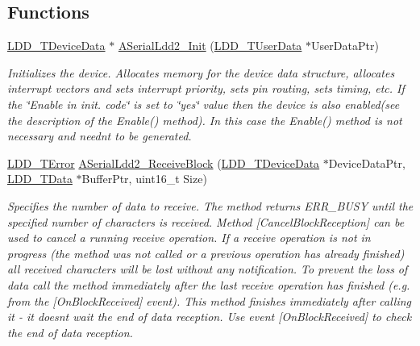 \subsection*{Functions}
\begin{DoxyCompactItemize}
\item 
\hyperlink{group___p_e___types__module_gac5cf1362f1f0e3a2ce71b1bf2276d091}{L\+D\+D\+\_\+\+T\+Device\+Data} $\ast$ \hyperlink{group___a_serial_ldd2__module_gaa0cd7e49c9c5deb19ce7f9ece16231c3}{A\+Serial\+Ldd2\+\_\+\+Init} (\hyperlink{group___p_e___types__module_ga0b66a73f87238a782318aa0be7578e35}{L\+D\+D\+\_\+\+T\+User\+Data} $\ast$User\+Data\+Ptr)
\begin{DoxyCompactList}\small\item\em Initializes the device. Allocates memory for the device data structure, allocates interrupt vectors and sets interrupt priority, sets pin routing, sets timing, etc. If the \char`\"{}\+Enable
    in init. code\char`\"{} is set to \char`\"{}yes\char`\"{} value then the device is also enabled(see the description of the Enable() method). In this case the Enable() method is not necessary and needn\textquotesingle{}t to be generated. \end{DoxyCompactList}\item 
\hyperlink{group___p_e___types__module_ga24c2b045fd04e79e85f261ce4df35588}{L\+D\+D\+\_\+\+T\+Error} \hyperlink{group___a_serial_ldd2__module_gaf41a4ccffe5f5791cbc9b6e6e912962d}{A\+Serial\+Ldd2\+\_\+\+Receive\+Block} (\hyperlink{group___p_e___types__module_gac5cf1362f1f0e3a2ce71b1bf2276d091}{L\+D\+D\+\_\+\+T\+Device\+Data} $\ast$Device\+Data\+Ptr, \hyperlink{group___p_e___types__module_gade8ef9401405bd941b6da738b807f980}{L\+D\+D\+\_\+\+T\+Data} $\ast$Buffer\+Ptr, uint16\+\_\+t Size)
\begin{DoxyCompactList}\small\item\em Specifies the number of data to receive. The method returns E\+R\+R\+\_\+\+B\+U\+SY until the specified number of characters is received. Method \mbox{[}Cancel\+Block\+Reception\mbox{]} can be used to cancel a running receive operation. If a receive operation is not in progress (the method was not called or a previous operation has already finished) all received characters will be lost without any notification. To prevent the loss of data call the method immediately after the last receive operation has finished (e.\+g. from the \mbox{[}On\+Block\+Received\mbox{]} event). This method finishes immediately after calling it -\/ it doesn\textquotesingle{}t wait the end of data reception. Use event \mbox{[}On\+Block\+Received\mbox{]} to check the end of data reception. \end{DoxyCompactList}\item 

\end{DoxyCompactItemize}

